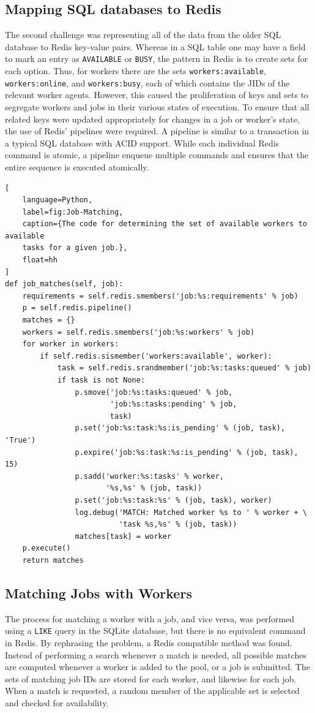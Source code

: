 \subsection{Mapping SQL databases to Redis}
The second challenge was representing all of the data from the older SQL
database to Redis key-value pairs. Whereas in a SQL table one may have a
field to mark an entry as \texttt{AVAILABLE} or \texttt{BUSY}, the pattern in
Redis is to create sets for each option. Thus, for workers there are the sets
\texttt{workers:available}, \texttt{workers:online}, and \texttt{workers:busy},
each of which contains the JIDs of the relevant worker agents. However, this
caused the proliferation of keys and sets to segregate workers and jobs in
their various states of execution. To ensure that all related keys were updated
appropriately for changes in a job or worker's state, the use of Redis'
pipelines were required. A pipeline is similar to a transaction in a typical
SQL database with ACID support. While each individual Redis command is atomic,
a pipeline enqueue multiple commands and ensures that the entire sequence is
executed atomically.

\begin{lstlisting}[
    language=Python,
    label=fig:Job-Matching,
    caption={The code for determining the set of available workers to available
    tasks for a given job.},
    float=hh
]
def job_matches(self, job):
    requirements = self.redis.smembers('job:%s:requirements' % job)
    p = self.redis.pipeline()
    matches = {}
    workers = self.redis.smembers('job:%s:workers' % job)
    for worker in workers:
        if self.redis.sismember('workers:available', worker):
            task = self.redis.srandmember('job:%s:tasks:queued' % job)
            if task is not None:
                p.smove('job:%s:tasks:queued' % job,
                        'job:%s:tasks:pending' % job,
                        task)
                p.set('job:%s:task:%s:is_pending' % (job, task), 'True')
                p.expire('job:%s:task:%s:is_pending' % (job, task), 15)
                p.sadd('worker:%s:tasks' % worker,
                       '%s,%s' % (job, task))
                p.set('job:%s:task:%s' % (job, task), worker)
                log.debug('MATCH: Matched worker %s to ' % worker + \
                          'task %s,%s' % (job, task))
                matches[task] = worker
    p.execute()
    return matches
\end{lstlisting}

\subsection{Matching Jobs with Workers}
The process for matching a worker with a job, and vice versa, was performed using
a \texttt{LIKE} query in the SQLite database, but there is no equivalent command
in Redis. By rephrasing the problem, a Redis compatible method was found. Instead
of performing a search whenever a match is needed, all possible matches are computed
whenever a worker is added to the pool, or a job is submitted. The sets of matching
job IDs are stored for each worker, and likewise for each job. When a match is
requested, a random member of the applicable set is selected and checked for
availability.

